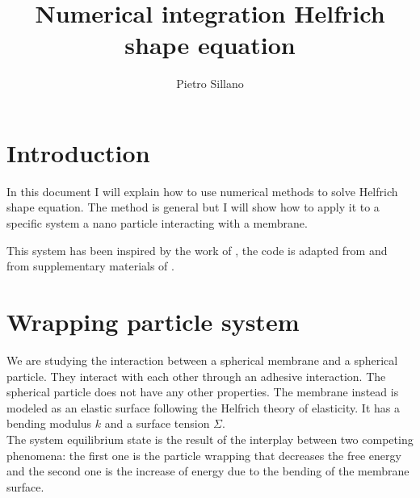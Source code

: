 \documentclass[12pt]{article}
\title{Numerical integration Helfrich shape equation}
\author{Pietro Sillano}
\begin{document}
\maketitle
\tableofcontents




\section{Introduction}
In this document I will explain how to use numerical methods to solve Helfrich shape equation. The method is general but I will show how to apply it to a specific system a nano particle interacting with a membrane.

This system has been inspired by the work of
\cite{agudo-canalejoCriticalParticleSizes2015}, the code is adapted from \cite{freyMembraneAreaGain2022} and from supplementary materials of \cite{christActiveShapeOscillations2021}.
\section{Wrapping particle system}



We are studying the interaction between a spherical membrane and a spherical particle. They interact with each other through an adhesive interaction. The spherical particle does not have any other properties. The membrane instead is modeled as an elastic surface following the Helfrich theory of elasticity. It has a bending modulus $k$ and a surface tension $\Sigma$. \\

The system equilibrium state is the result of the interplay between two competing phenomena: the first one is the particle wrapping that decreases the free energy and the second one is the increase of energy due to the bending of the membrane surface.
\end{document}
